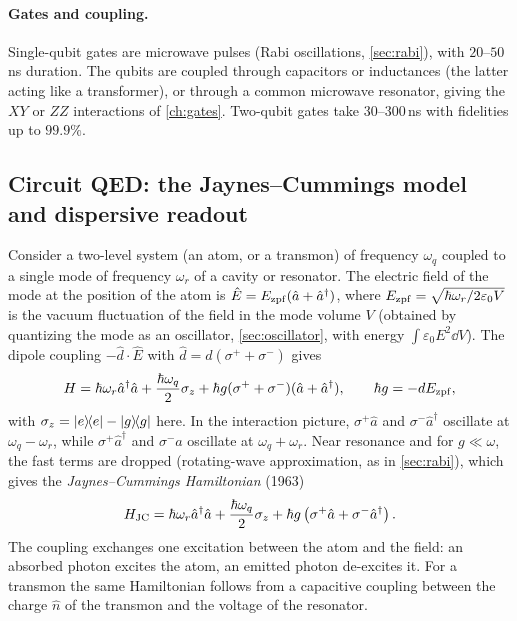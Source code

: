 \paragraph{Gates and coupling.} Single-qubit gates are microwave pulses (Rabi oscillations, \cref{sec:rabi}), with $20$--$50$\,ns duration. The qubits are coupled through capacitors or inductances (the latter acting like a transformer), or through
a common microwave resonator, giving the $XY$ or $ZZ$ interactions of \cref{ch:gates}. Two-qubit gates take $30$--$300$\,ns with fidelities up to $99.9\%$.

\subsection{Circuit QED: the Jaynes--Cummings model and dispersive readout}\label{sec:jc}
\begin{origin}
Consider a two-level system (an atom, or a transmon) of frequency $\omega_q$ coupled to a single mode of frequency $\omega_r$ of a cavity or resonator. The electric field of the mode at the position of the atom is $\hat E=E_{\rm zpf}(\hat a+\hat a^\dagger)$,
where $E_{\rm zpf}=\sqrt{\hbar\omega_r/2\varepsilon_0V}$ is the vacuum fluctuation of the field in the mode volume $V$ (obtained by quantizing the mode as an oscillator, \cref{sec:oscillator}, with energy $\int\varepsilon_0E^2\dd V$). The dipole coupling
$-\hat d\cdot\hat E$ with $\hat d=d(\sigma^++\sigma^-)$ gives
\begin{equation}
  H=\hbar\omega_r\hat a^\dagger\hat a+\frac{\hbar\omega_q}2\sigma_z+\hbar g(\sigma^++\sigma^-)(\hat a+\hat a^\dagger),\qquad\hbar g=-dE_{\rm zpf},
\end{equation}
with $\sigma_z=\left|e\middle\rangle\!\middle\langle e\right|-\left|g\middle\rangle\!\middle\langle g\right|$ here. In the interaction picture, $\sigma^+\hat a$ and $\sigma^-\hat a^\dagger$ oscillate at $\omega_q-\omega_r$, while $\sigma^+\hat a^\dagger$ and $\sigma^-\hat a$ oscillate at $\omega_q+\omega_r$. Near resonance and for
$g\ll\omega$, the fast terms are dropped (rotating-wave approximation, as in \cref{sec:rabi}), which gives the \emph{Jaynes--Cummings Hamiltonian} (1963)
\begin{equation}\label{eq:jc}
  H_{\rm JC}=\hbar\omega_r\hat a^\dagger\hat a+\frac{\hbar\omega_q}2\sigma_z+\hbar g\left(\sigma^+\hat a+\sigma^-\hat a^\dagger\right).
\end{equation}
The coupling exchanges one excitation between the atom and the field: an absorbed photon excites the atom, an emitted photon de-excites it. For a transmon the same Hamiltonian follows from a capacitive coupling between the charge $\hat n$ of the
transmon and the voltage of the resonator.
\end{origin}
